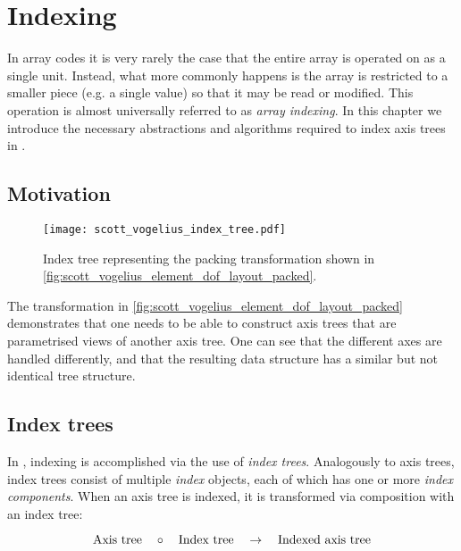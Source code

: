 \documentclass[thesis]{subfiles}
\begin{document}
\chapter{Indexing}
\label{chapter:indexing}

In array codes it is very rarely the case that the entire array is operated on as a single unit.
Instead, what more commonly happens is the array is restricted to a smaller piece (e.g. a single value) so that it may be read or modified.
This operation is almost universally referred to as \textit{array indexing}.
In this chapter we introduce the necessary abstractions and algorithms required to index axis trees in .

\section{Motivation}  %

\begin{sidewaysfigure}
  \centering
  \texttt{[image: scott\_vogelius\_index\_tree.pdf]}
  \caption{Index tree representing the packing transformation shown in \cref{fig:scott_vogelius_element_dof_layout_packed}.}
  \label{fig:scott_vogelius_element_index_tree}
\end{sidewaysfigure}

The transformation in \cref{fig:scott_vogelius_element_dof_layout_packed} demonstrates that one needs to be able to construct axis trees that are parametrised views of another axis tree.
One can see that the different axes are handled differently, and that the resulting data structure has a similar but not identical tree structure.


\section{Index trees}
\label{sec:index_trees}

In , indexing is accomplished via the use of \textit{index trees}.
Analogously to axis trees, index trees consist of multiple \textit{index} objects, each of which has one or more \textit{index components}.
When an axis tree is indexed, it is transformed via composition with an index tree:

\begin{equation*}
  \textnormal{Axis tree} \quad \circ \quad \textnormal{Index tree} \quad \to \quad \textnormal{Indexed axis tree}
\end{equation*}
\end{document}
